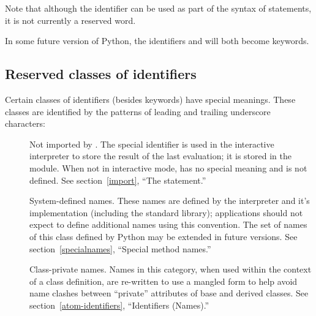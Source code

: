 
Note that although the identifier  can be used as part of the
syntax of  statements, it is not currently a reserved
word.

In some future version of Python, the identifiers  and
 will both become keywords.


\subsection{Reserved classes of identifiers\label{id-classes}}

Certain classes of identifiers (besides keywords) have special
meanings.  These classes are identified by the patterns of leading and
trailing underscore characters:

\begin{description}

\item[\code{_*}]
  Not imported by .  The special
  identifier \samp{_} is used in the interactive interpreter to store
  the result of the last evaluation; it is stored in the
   module.  When not in interactive mode, \samp{_}
  has no special meaning and is not defined.
  See section~\ref{import}, ``The  statement.''


\item[\code{__*__}]
  System-defined names.  These names are defined by the interpreter
  and it's implementation (including the standard library);
  applications should not expect to define additional names using this
  convention.  The set of names of this class defined by Python may be
  extended in future versions.
  See section~\ref{specialnames}, ``Special method names.''

\item[\code{__*}]
  Class-private names.  Names in this category, when used within the
  context of a class definition, are re-written to use a mangled form
  to help avoid name clashes between ``private'' attributes of base
  and derived classes.
  See section~\ref{atom-identifiers}, ``Identifiers (Names).''

\end{description}


